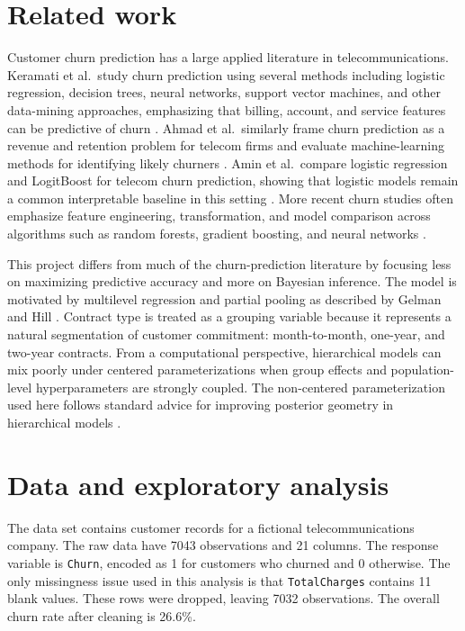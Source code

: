 \documentclass{article}
\begin{document}
\section{Related work}

Customer churn prediction has a large applied literature in telecommunications. Keramati et al.\ study churn prediction using several methods including logistic regression, decision trees, neural networks, support vector machines, and other data-mining approaches, emphasizing that billing, account, and service features can be predictive of churn \cite{keramati2012}. Ahmad et al.\ similarly frame churn prediction as a revenue and retention problem for telecom firms and evaluate machine-learning methods for identifying likely churners \cite{ahmad2019}. Amin et al.\ compare logistic regression and LogitBoost for telecom churn prediction, showing that logistic models remain a common interpretable baseline in this setting \cite{amin2020}. More recent churn studies often emphasize feature engineering, transformation, and model comparison across algorithms such as random forests, gradient boosting, and neural networks \cite{jeb2022}.

This project differs from much of the churn-prediction literature by focusing less on maximizing predictive accuracy and more on Bayesian inference. The model is motivated by multilevel regression and partial pooling as described by Gelman and Hill \cite{gelmanhill2007}. Contract type is treated as a grouping variable because it represents a natural segmentation of customer commitment: month-to-month, one-year, and two-year contracts. From a computational perspective, hierarchical models can mix poorly under centered parameterizations when group effects and population-level hyperparameters are strongly coupled. The non-centered parameterization used here follows standard advice for improving posterior geometry in hierarchical models \cite{betancourt2019}.

\section{Data and exploratory analysis}

The data set contains customer records for a fictional telecommunications company. The raw data have 7043 observations and 21 columns. The response variable is \texttt{Churn}, encoded as 1 for customers who churned and 0 otherwise. The only missingness issue used in this analysis is that \texttt{TotalCharges} contains 11 blank values. These rows were dropped, leaving 7032 observations. The overall churn rate after cleaning is 26.6\%.
\end{document}

